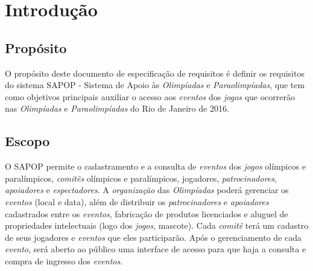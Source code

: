 \documentclass[
10pt, %
a4paper, %
oneside, %
headinclude,footinclude, %
BCOR5mm, %
]{scrartcl}
\begin{document}



\newpage %


\section{Introdução}\label{intro}


\subsection{Propósito}
O propósito deste documento de especificação de requisitos é definir os requisitos do
sistema SAPOP - Sistema de Apoio às \textit{Olimpíadas} e \textit{Paraolimpíadas}, que tem como objetivos
principais auxiliar o acesso aos \textit{eventos} dos \textit{jogos} que ocorrerão nas \textit{Olimpíadas} e \textit{Paraolimpíadas} do Rio de Janeiro de 2016.

\subsection{Escopo}
O SAPOP permite o cadastramento e a consulta de \textit{eventos} dos \textit{jogos} olímpicos e paralímpicos,
\textit{comitês} olímpicos e paralímpicos, jogadores, \textit{patrocinadores}, \textit{apoiadores} e \textit{espectadores}.
A \textit{organização} das \textit{Olimpíadas} poderá gerenciar os \textit{eventos} (local e data), além de distribuir
os \textit{patrocinadores} e \textit{apoiadores} cadastrados entre os \textit{eventos}, fabricação de produtos licenciados
e aluguel de propriedades intelectuais (logo dos \textit{jogos}, mascote). Cada \textit{comitê} terá um cadastro
de seus jogadores e \textit{eventos} que eles participarão. Após o gerenciamento de cada \textit{evento}, será
aberto ao público uma interface de acesso para que haja a consulta e compra de ingresso dos \textit{eventos}.
\end{document}
